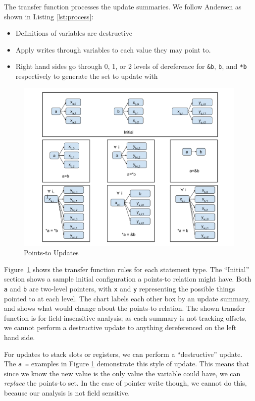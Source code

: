 The transfer function processes the update summaries.
We follow Andersen as shown in Listing \ref{lst:process}:
\begin{itemize}
\item Definitions of variables are destructive
\item Apply writes through variables to each value they may point to.
\item Right hand sides go through 0, 1, or 2 levels of dereference for \texttt{\&b}, \texttt{b}, and \texttt{*b} respectively to generate the set to update with
\end{itemize}

\begin{figure}
	\centering
	\includegraphics[scale=0.35]{alias/pts-update.pdf}
	\caption{Points-to Updates}
	\label{fig:pts-update}
\end{figure}

Figure~\ref{fig:pts-update} shows the transfer function rules for each
statement type.
The ``Initial'' section shows a sample initial configuration a points-to relation might have.
Both \texttt{a} and \texttt{b} are two-level pointers, with \texttt{x} and \texttt{y} representing the possible things pointed to at each level.
The chart labels each other box by an update summary, and shows what would change about the points-to relation.
The shown transfer function is for field-insensitive analysis; as each summary is not tracking offsets, we cannot perform a destructive update to anything dereferenced on the left hand side.

For updates to stack slots or registers, we can perform a ``destructive'' update.
The \texttt{a =} examples in Figure \ref{fig:pts-update} demonstrate this style of update.
This means that since we know the new value
is the only value the variable could have, we can \emph{replace} the
points-to set.  In the case of pointer write though, we cannot do
this, because our analysis is not field sensitive.

